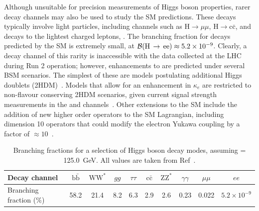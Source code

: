 Although unsuitable for precision measurements of Higgs boson properties, rarer decay channels may also be used to study the SM predictions. These decays typically involve light particles, including channels such as $\mathrm{H}\rightarrow\mu\mu$, $\mathrm{H}\rightarrow \mathrm{c}\bar{\mathrm{c}}$, and decays to the lightest charged leptons, \Hee. The branching fraction for \Hee decays predicted by the SM is extremely small, at $\mathcal{B}(\mathrm{H}\,\rightarrow\,\mathrm{ee}) \approx 5.2\times10^{-9}$. Clearly, a decay channel of this rarity is inaccessible with the data collected at the LHC during Run 2 operation; however, enhancements to \BHee are predicted under several BSM scenarios. The simplest of these are models postulating additional Higgs doublets (2HDM)~\cite{BSM_vecferm,BSM_2HDM}. Models that allow for an enhancement in $\kappa_e$ are restricted to non-flavour conserving 2HDM scenarios, given current signal strength measurements in the \Hmumu and \Htautau channels~\cite{CMSHMuMu,CMSHtautau,ATLASHtautau}. Other extensions to the SM include the addition of new higher order operators to the SM Lagrangian, including dimension 10 operators that could modify the electron Yukawa coupling by a factor of ${\approx}10$~\cite{dim_ten_operators}. 

\begin{table}[htbp!]
\centering
\caption[Branching fractions for selected Higgs boson decay modes, assuming \mH= 125.0~GeV.]{Branching fractions for a selection of Higgs boson decay modes, assuming \mH= 125.0~GeV. All values are taken from Ref~\cite{YR4}.}
\label{tab:higgs_decay_brs}
\begin{tabular}{l|ccccccccc}
\hline
Decay channel          & $\mathrm{b}\bar{\mathrm{b}}$ & $\mathrm{WW}^{*}$ & $gg$ & $\tau\tau$ & $\mathrm{c}\bar{\mathrm{c}}$ & $\mathrm{Z}\mathrm{Z}^{*}$ & $\gamma\gamma$ & $\mu\mu$ & $ee$ \\ \hline
Branching fraction (\%) & 58.2                        & 21.4    & 8.2  & 6.3       & 2.9       & 2.6     & 0.23           & 0.022     & $5.2\times10^{-9}$\\                                                                              
\hline
\end{tabular}                  
\end{table}  


